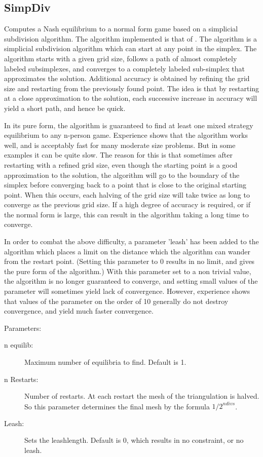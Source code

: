 \subsection{SimpDiv}\label{SimpDiv}
Computes a Nash equilibrium to a normal form game based
on a simplicial subdivision algorithm.  The algorithm implemented is
that of \cite{VTH:1987}.  The algorithm is a simplicial subdivision
algorithm which can start at any point in the simplex.  The algorithm
starts with a given grid size, follows a path of almost completely labeled
subsimplexes, and converges to a completely labeled sub-simplex that
approximates the solution.  Additional accuracy is obtained by refining
the grid size and restarting from the previously found point.  The idea is
that by restarting at a close approximation to the solution, each
successive increase in accuracy will yield a short path, and hence be
quick.

In its pure form, the algorithm is guaranteed to find at least one
mixed strategy equilibrium to any n-person game.  Experience shows
that the algorithm works well, and is acceptably fast for many
moderate size problems.  But in some examples it can be quite slow.
The reason for this is that sometimes after restarting with a refined
grid size, even though the starting point is a good approximation to
the solution, the algorithm will go to the boundary of the simplex
before converging back to a point that is close to the original
starting point.  When this occurs, each halving of the grid size will
take twice as long to converge as the previous grid size.  If a high
degree of accuracy is required, or if the normal form is large, this
can result in the algorithm taking a long time to converge.

In order to combat the above difficulty, a parameter 'leash' has been
added to the algorithm which places a limit on the distance which the
algorithm can wander from the restart point. (Setting this parameter
to 0 results in no limit, and gives the pure form of the algorithm.)
With this parameter set to a non trivial value, the algorithm is no
longer guaranteed to converge, and setting small values of the
parameter will sometimes yield lack of convergence.  However,
experience shows that values of the parameter on the order of 10
generally do not destroy convergence, and yield much faster
convergence.

Parameters:

\begin{description}
\item[n equilib:] Maximum number of equilibria to find. Default is 1.  
\item[n Restarts:] Number of restarts.  At each restart the mesh of the
triangulation is halved.  So this parameter determines the final mesh
by the formula ${1/2}^{ndivs}$.
\item[Leash:] Sets the leashlength. Default is 0, which results in no
constraint, or no leash.  
\end{description}

